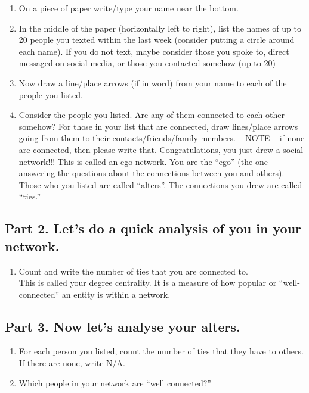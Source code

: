\documentclass[
  letterpaper,
  DIV=11,
  numbers=noendperiod]{scrreprt}
\providecommand{\tightlist}{%
  \setlength{\itemsep}{0pt}\setlength{\parskip}{0pt}}\usepackage{longtable,booktabs,array}
\begin{document}
\begin{enumerate}
\def\labelenumi{\Alph{enumi}.}
\tightlist
\item
  On a piece of paper write/type your name near the bottom.
\item
  In the middle of the paper (horizontally left to right), list the
  names of up to 20 people you texted within the last week (consider
  putting a circle around each name). If you do not text, maybe consider
  those you spoke to, direct messaged on social media, or those you
  contacted somehow (up to 20)
\item
  Now draw a line/place arrows (if in word) from your name to each of
  the people you listed.
\item
  Consider the people you listed. Are any of them connected to each
  other somehow? For those in your list that are connected, draw
  lines/place arrows going from them to their contacts/friends/family
  members. -- NOTE -- if none are connected, then please write that.
  Congratulations, you just drew a social network!!! This is called an
  ego-network. You are the ``ego'' (the one answering the questions
  about the connections between you and others). Those who you listed
  are called ``alters''. The connections you drew are called ``ties.''
\end{enumerate}

\subsection{Part 2. Let's do a quick analysis of you in your
network.}\label{part-2.-lets-do-a-quick-analysis-of-you-in-your-network.}

\begin{enumerate}
\def\labelenumi{\Alph{enumi}.}
\tightlist
\item
  Count and write the number of ties that you are connected to.\\
  This is called your degree centrality. It is a measure of how popular
  or ``well-connected'' an entity is within a network.
\end{enumerate}

\subsection{Part 3. Now let's analyse your
alters.}\label{part-3.-now-lets-analyse-your-alters.}

\begin{enumerate}
\def\labelenumi{\Alph{enumi}.}
\tightlist
\item
  For each person you listed, count the number of ties that they have to
  others. If there are none, write N/A.
\item
  Which people in your network are ``well connected?''
\end{enumerate}
\end{document}
